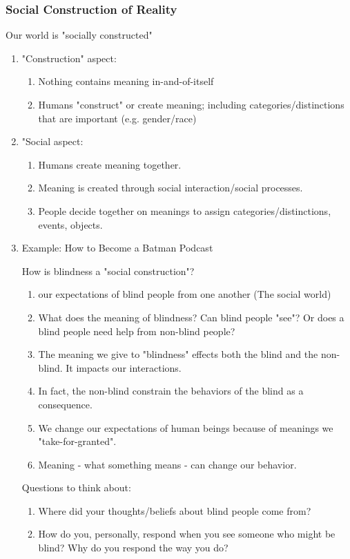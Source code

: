 \documentclass[12pt,a4paper]{article}
\begin{document}
\subsubsection{Social Construction of Reality}
Our world is "socially constructed"
\begin{enumerate}
	\item "Construction" aspect: 
	\begin{enumerate}
		\item Nothing contains meaning in-and-of-itself
		\item Humans "construct" or create meaning; including categories/distinctions that are important (e.g. gender/race)
	\end{enumerate}	
	\item "Social aspect: 
	\begin{enumerate}
		\item Humans create meaning together. 
		\item Meaning is created through social interaction/social processes.
		\item People decide together on meanings to assign categories/distinctions, events, objects. 
	\end{enumerate}
	\item Example: How to Become a Batman Podcast
	\begin{eg}{ }
		How is blindness a "social construction"?
		\begin{enumerate}
			\item our expectations of blind people from one another (The social world)
			\item What does the meaning of blindness? Can blind people "see"? Or does a blind people need help from non-blind people?
			\item The meaning we give to "blindness" effects both the blind and the non-blind. It impacts our interactions. 
			\item In fact, the non-blind constrain the behaviors of the blind as a consequence. 
			\item We change our expectations of human beings because of meanings we "take-for-granted".
			\item Meaning - what something means - can change our behavior.  
		\end{enumerate}
		Questions to think about: 
		\begin{enumerate}
			\item Where did your thoughts/beliefs about blind people come from?
			\item How do you, personally, respond when you see someone who might be blind?  Why do you respond the way you do?

\end{enumerate}
\end{eg}
\end{enumerate}
\end{document}
